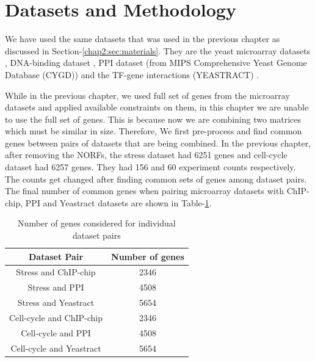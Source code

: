 \section{Datasets and Methodology} \label{chap3:sec:materials}

We have used the same datasets that was used in the previous chapter as discussed in Section-\ref{chap2:sec:materials}. They are the yeast microarray 
datasets \citep{gasch00genomicexpn,spellman98comprehensive}, DNA-binding dataset \citep{harbison04transcriptional}, 
PPI dataset (from MIPS Comprehensive Yeast Genome Database (CYGD)) \citep{Gueldener2006MPact} and the TF-gene interactions (YEASTRACT) \citep{Teixeira06yeastract}. 

While in the previous chapter, we used full set of genes from the microarray datasets and applied available constraints on them, in this chapter we are unable to use 
the full set of genes. This is because now we are combining two matrices which must be similar in size. Therefore, We first pre-process and find common genes between 
pairs of datasets that are being combined. In the previous chapter, after removing the NORFs, the stress dataset had 6251 genes and cell-cycle dataset had 6257 genes. 
They had 156 and 60 experiment counts respectively. The counts get changed after finding common sets of genes among dataset pairs. The final number of common genes when pairing 
microarray datasets with ChIP-chip, PPI and Yeastract datasets are shown in Table-\ref{tab:datasetpair_commongenes}.  
 
\begin{table}
\centering
\begin{tabular}{|c|c|}
\hline
Dataset Pair & Number of genes \\ 
\hline
Stress and ChIP-chip & 2346 \\
Stress and PPI       & 4508 \\
Stress and Yeastract  & 5654 \\
\hline 
Cell-cycle and ChIP-chip & 2346\\
Cell-cycle and PPI       & 4508\\
Cell-cycle and Yeastract  & 5654\\
\hline
\end{tabular}
\caption{Number of genes considered for individual dataset pairs}
\label{tab:datasetpair_commongenes}
\end{table}

